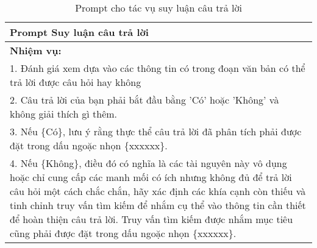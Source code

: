 \begin{table}[ht]
    \centering
    \caption{Prompt cho tác vụ suy luận câu trả lời}
    \label{tab:reasoning_prompt}
    \small{\begin{tabular}{p{}}
            \toprule
            \textbf{Prompt Suy luận câu trả lời}                                                                                                                                                                                                                                                                                                                                                         \\
            \midrule
            \textbf{Nhiệm vụ:}                                                                                                                                                                                                                                                                                                                                                                           \\
            1. Đánh giá xem dựa vào các thông tin có trong đoạn văn bản có thể trả lời được câu hỏi hay không                                                                                                                                                                                                                                                                                            \\
            2. Câu trả lời của bạn phải bắt đầu bằng 'Có' hoặc 'Không' và không giải thích gì thêm.                                                                                                                                                                                                                                                                                                      \\
            3. Nếu \{Có\}, lưu ý rằng thực thể câu trả lời đã phân tích phải được đặt trong dấu ngoặc nhọn \{xxxxxx\}.                                                                                                                                                                                                                                                                                   \\
            4. Nếu \{Không\}, điều đó có nghĩa là các tài nguyên này vô dụng hoặc chỉ cung cấp các manh mối có ích nhưng không đủ để trả lời câu hỏi một cách chắc chắn, hãy xác định các khía cạnh còn thiếu và tinh chỉnh truy vấn tìm kiếm để nhắm cụ thể vào thông tin cần thiết để hoàn thiện câu trả lời. Truy vấn tìm kiếm được nhắm mục tiêu cũng phải được đặt trong dấu ngoặc nhọn \{xxxxxx\}. \\

\end{tabular}}
\end{table}

